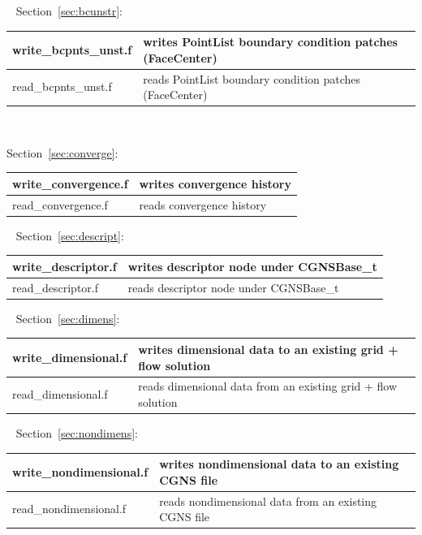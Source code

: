 \documentclass[12pt]{article}
\begin{document}
~\newline
Section~\ref{sec:bcunstr}:

\begin{tabular}{ | l | l | }
\hline
write\_bcpnts\_unst.f      & writes PointList boundary condition patches (FaceCenter) \\ \hline
read\_bcpnts\_unst.f       & reads PointList boundary condition patches (FaceCenter) \\ \hline
\end{tabular}

~\newline
{}

\noindent Section~\ref{sec:converge}:

\begin{tabular}{ | l | l | }
\hline
write\_convergence.f      & writes convergence history \\ \hline
read\_convergence.f       & reads convergence history \\ \hline
\end{tabular}

~\newline
Section~\ref{sec:descript}:

\begin{tabular}{ | l | l | }
\hline
write\_descriptor.f       & writes descriptor node under CGNSBase\_t \\ \hline
read\_descriptor.f        & reads descriptor node under CGNSBase\_t \\ \hline
\end{tabular}

~\newline
Section~\ref{sec:dimens}:

\begin{tabular}{ | l | l | }
\hline
write\_dimensional.f      & writes dimensional data to an existing grid + flow solution \\ \hline
read\_dimensional.f       & reads dimensional data from an existing grid + flow solution \\ \hline
\end{tabular}

~\newline
Section~\ref{sec:nondimens}:

\begin{tabular}{ | l | l | }
\hline
write\_nondimensional.f   & writes nondimensional data to an existing CGNS file \\ \hline
read\_nondimensional.f    & reads nondimensional data from an existing CGNS file \\ \hline
\end{tabular}
\end{document}
